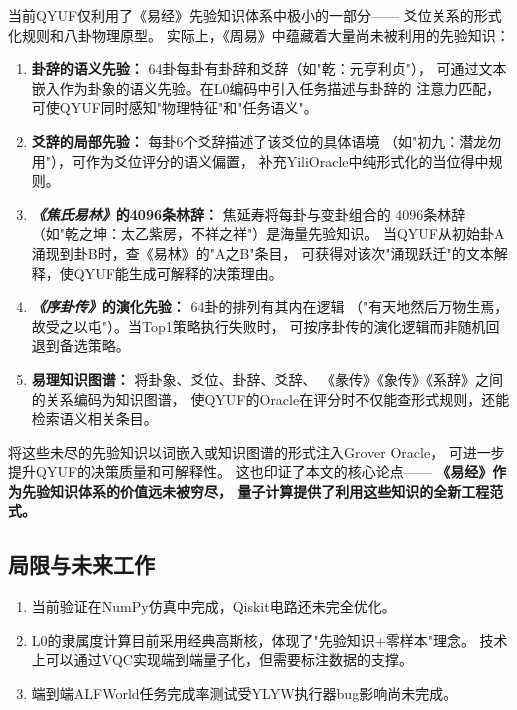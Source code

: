 \documentclass[twocolumn]{article}
\begin{document}
当前QYUF仅利用了《易经》先验知识体系中极小的一部分——
爻位关系的形式化规则和八卦物理原型。
实际上，《周易》中蕴藏着大量尚未被利用的先验知识：

\begin{enumerate}
  \item \textbf{卦辞的语义先验：} 64卦每卦有卦辞和爻辞（如"乾：元亨利贞"），
        可通过文本嵌入作为卦象的语义先验。在L0编码中引入任务描述与卦辞的
        注意力匹配，可使QYUF同时感知"物理特征"和"任务语义"。

  \item \textbf{爻辞的局部先验：} 每卦6个爻辞描述了该爻位的具体语境
        （如"初九：潜龙勿用"），可作为爻位评分的语义偏置，
        补充YiliOracle中纯形式化的当位得中规则。

  \item \textbf{\emph{《焦氏易林》}的4096条林辞：} 焦延寿将每卦与变卦组合的
        4096条林辞（如"乾之坤：太乙紫房，不祥之祥"）是海量先验知识。
        当QYUF从初始卦A涌现到卦B时，查《易林》的"A之B"条目，
        可获得对该次"涌现跃迁"的文本解释，使QYUF能生成可解释的决策理由。

  \item \textbf{\emph{《序卦传》}的演化先验：} 64卦的排列有其内在逻辑
        （"有天地然后万物生焉，故受之以屯"）。当Top1策略执行失败时，
        可按序卦传的演化逻辑而非随机回退到备选策略。

  \item \textbf{易理知识图谱：} 将卦象、爻位、卦辞、爻辞、
        《彖传》《象传》《系辞》之间的关系编码为知识图谱，
        使QYUF的Oracle在评分时不仅能查形式规则，还能检索语义相关条目。
\end{enumerate}

将这些未尽的先验知识以词嵌入或知识图谱的形式注入Grover Oracle，
可进一步提升QYUF的决策质量和可解释性。
这也印证了本文的核心论点——
\textbf{《易经》作为先验知识体系的价值远未被穷尽，
量子计算提供了利用这些知识的全新工程范式。}

\subsection{局限与未来工作}

\begin{enumerate}
  \item 当前验证在NumPy仿真中完成，Qiskit电路还未完全优化。
  \item L0的隶属度计算目前采用经典高斯核，体现了"先验知识+零样本"理念。
        技术上可以通过VQC实现端到端量子化，但需要标注数据的支撑。
  \item 端到端ALFWorld任务完成率测试受YLYW执行器bug影响尚未完成。
\end{enumerate}
\end{document}
